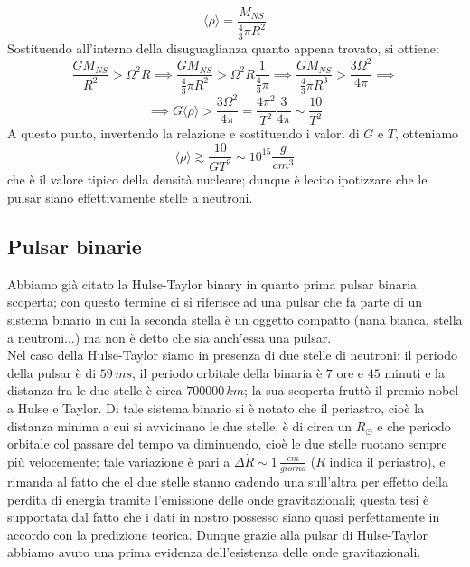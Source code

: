 $$\langle \rho \rangle=\frac{M_{NS}}{\frac{4}{3} \pi R^2}$$
Sostituendo all'interno della disuguaglianza quanto appena trovato, si ottiene:
$$\frac{GM_{NS}}{R^2}>\Omega^2 R \implies \frac{GM_{NS}}{\frac{4}{3} \pi R^2}>\Omega^2 R \frac{1}{\frac{4}{3} \pi} \implies \frac{GM_{NS}}{\frac{4}{3} \pi R^3}> \frac{3 \Omega^2}{4 \pi} \implies$$
$$\implies G \langle \rho \rangle > \frac{3 \Omega^2}{4 \pi}= \frac{4 \pi^2}{T^2} \frac{3}{4 \pi} \sim \frac{10}{T^2}$$
A questo punto, invertendo la relazione e sostituendo i valori di $G$ e $T$, otteniamo
$$\langle \rho \rangle \gtrsim \frac{10}{G T^2} \sim 10^ {15} \frac{g}{cm^3}$$
che è il valore tipico della densità nucleare; dunque è lecito ipotizzare che le pulsar siano effettivamente stelle a neutroni.

\subsection{Pulsar binarie}
Abbiamo già citato la Hulse-Taylor binary in quanto prima pulsar binaria scoperta; con questo termine ci si riferisce ad una pulsar che fa parte di un sistema binario in cui la seconda stella è un oggetto compatto (nana bianca, stella a neutroni...) ma non è detto che sia anch'essa una pulsar.\\
Nel caso della Hulse-Taylor siamo in presenza di due stelle di neutroni: il periodo della pulsar è di $59 \, ms$, il periodo orbitale della binaria è $7$ ore e $45$ minuti e la distanza fra le due stelle è circa $700000 \, km$; la sua scoperta fruttò il premio nobel a Hulse e Taylor. Di tale sistema binario si è notato che il periastro, cioè la distanza minima a cui si avvicinano le due stelle, è di circa un $R_{\odot}$ e che periodo orbitale col passare del tempo va diminuendo, cioè le due stelle ruotano sempre più velocemente; tale variazione è pari a $\Delta \dot{R} \sim 1 \, \frac{cm}{giorno}$ ($R$ indica il periastro), e rimanda al fatto che el due stelle stanno cadendo una sull'altra per effetto della perdita di energia tramite l'emissione delle onde gravitazionali; questa tesi è supportata dal fatto che i dati in nostro possesso siano quasi perfettamente in accordo con la predizione teorica. Dunque grazie alla pulsar di Hulse-Taylor abbiamo avuto una prima evidenza dell'esistenza delle onde gravitazionali.

